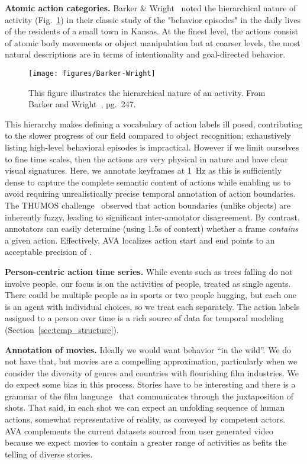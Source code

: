 \documentclass[10pt,twocolumn,letterpaper]{article}
\begin{document}
\noindent \textbf{Atomic action categories.} Barker \& Wright~\cite{Barker1954} noted the hierarchical nature of activity (Fig.~\ref{fig:barker-wright}) in their classic study of the "behavior episodes" in the daily lives of the residents of a small town in Kansas.  At the finest level, the actions consist of atomic body movements or object manipulation but at coarser levels, the most natural descriptions are in terms of intentionality and goal-directed behavior. 

\begin{figure}[t]
\vspace{-0.5em}
\centerline{\texttt{[image: figures/Barker-Wright]}}
\vspace{-0.5em}
\caption{This figure illustrates the hierarchical nature of an activity. From Barker and Wright~\cite{Barker1954}, pg.~247.}
\label{fig:barker-wright}
\vspace{-1em}
\end{figure}

This hierarchy makes defining a vocabulary of action labels ill posed, contributing to the slower progress of our field compared to object recognition; exhaustively listing high-level behavioral episodes is impractical. However if we limit ourselves to fine time scales, then the actions are very physical in nature and have clear visual signatures. Here, we annotate keyframes at 1~Hz as this is sufficiently dense to capture the complete semantic content of actions while enabling us to avoid requiring unrealistically precise temporal annotation of action boundaries. The THUMOS challenge~\cite{THUMOS} observed that action boundaries (unlike objects) are inherently fuzzy, leading to significant inter-annotator disagreement. By contrast, annotators can easily determine (using 1.5s of context) whether a frame \emph{contains} a given action. Effectively, AVA localizes action start and end points to an acceptable precision of .

\noindent \textbf{Person-centric action time series.} While events such as trees falling do not involve people, our focus is on the activities of people, treated as single agents. There could be multiple people as in sports or two people hugging, but each one is an agent with individual choices, so we treat each separately. The action labels assigned to a person over time is a rich source of data for temporal modeling (Section~\ref{sec:temp_structure}).

\noindent \textbf{Annotation of movies.} Ideally we would want behavior ``in the wild''. We do not have that, but movies are a compelling approximation, particularly when we consider the diversity of genres and countries with flourishing film industries. We do expect some bias in this process. Stories have to be interesting and there is a grammar of the film language~\cite{Arijon1991} that communicates through the juxtaposition of shots. That said, in each shot we can expect an unfolding sequence of human actions, somewhat representative of reality, as conveyed by competent actors. AVA complements the current datasets sourced from user generated video because we expect movies to contain a greater range of activities as befits the telling of diverse stories.
\end{document}
